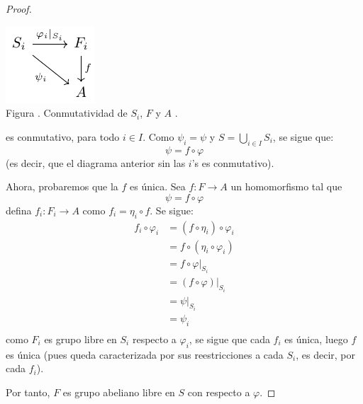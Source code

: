 \documentclass[12pt]{report}
\theoremstyle{largebreak}
\newcommand\cf[3]{\ensuremath{#1:#2\rightarrow#3}}
\newcounter{figcount}
\begin{document}
\begin{proof}
        \begin{minipage}{\textwidth}
            \begin{center}
                \includegraphics[scale=1.5]{images/fig_9.pdf}\\
                Figura \thefigcount. Conmutatividad de $S_i$, $F$ y $A$ .
            \end{center}
        \end{minipage}

        es conmutativo, para todo $i\in I$. Como $\psi_i=\psi$ y $S=\bigcup_{i\in I}S_i$, se sigue que:
        \begin{equation*}
            \psi=f\circ\varphi
        \end{equation*}
        (es decir, que el diagrama anterior sin las $i$'s es conmutativo).

        Ahora, probaremos que la $f$ es única. Sea $\cf{f}{F}{A}$ un homomorfismo tal que
        \begin{equation*}
            \psi=f\circ\varphi
        \end{equation*}
        defina $\cf{f_i}{F_i}{A}$ como $f_i=\eta_i\circ f$. Se sigue:
        \begin{equation*}
            \begin{split}
                f_i\circ\varphi_i&=(f\circ\eta_i)\circ\varphi_i\\
                &=f\circ(\eta_i\circ\varphi_i)\\
                &=f\circ\varphi\big|_{S_i}\\
                &=(f\circ \varphi)\big|_{S_i}\\
                &=\psi\big|_{S_i}\\
                &=\psi_i\\
            \end{split}
        \end{equation*}
        como $F_i$ es grupo libre en $S_i$ respecto a $\varphi_i$, se sigue que cada $f_i$ es única, luego $f$ es única (pues queda caracterizada por sus reestricciones a cada $S_i$, es decir, por cada $f_i$).

        Por tanto, $F$ es grupo abeliano libre en $S$ con respecto a $\varphi$.
    \end{proof}
\end{document}
